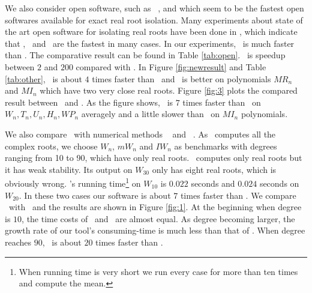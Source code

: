  We also consider open software,  such as \cf\  \cite{hemmer09}, \AND\cite{Tsigaridas2016} and \SLV\cite{kobel2016computing}  which
 seem to be the fastest  open softwares  available for exact real root isolation. Many experiments  about  state of the art open software for isolating
 real roots have been done in \cite{hemmer09,Tsigaridas2016,kobel2016computing},  which  indicate that     \cf, \AND\ and \SLV\
 are  the fastest in many cases.
 In our experiments, \froot\ is much faster than \cf. %
 The comparative result can be found in
 Table \ref{tab:open}. \froot\ is speedup between $2$ and $200$ compared with \cf.  In Figure \ref{fig:newresult} and Table \ref{tab:other}, \froot\ is about $4$ times faster than \AND\ and \AND\ is better on polynomials $MR_n$ and $MI_n$ which have two very close real roots.  Figure \ref{fig:3} plots the  compared
 	result between \froot\ and \SLV. As the figure shows, \froot\  is $7$ times faster than  \SLV\ on $W_n,T_n,U_n,H_n,WP_n$ averagely and a little slower than \SLV\ on $MI_n$ polynomials.


  We also compare \froot\  with numerical methods  \eign\ \cite{eigsolev} and \sle\ \cite{hemmer09}. As \eign\ computes all the complex roots, we choose $W_n$, $mW_n$ and $IW_n$ as benchmarks with degrees ranging from 10 to 90, which have only real roots. \sle\ computes only real roots but it has weak stability. Its output on $W_{30}$ only has eight real roots, which is obviously wrong. \sle's running time\footnote{When  running time is very short we run every case for more than ten times and compute the mean.} on $W_{10}$ is $0.022$ seconds and
 $0.024$ seconds on $W_{20}$. In these two cases our software is about $7$ times faster than \sle. We compare \froot\ with  \eign\ and the results are  shown in Figure \ref{fig:1}.
 At the beginning when degree is $10$, the time costs of \froot\ and \eign\ are
 almost equal. As degree becoming larger, the growth rate of our tool's consuming-time is much less than that of  \eign.  When degree reaches $90$, \froot\ is about $20$ times faster than \eign.


